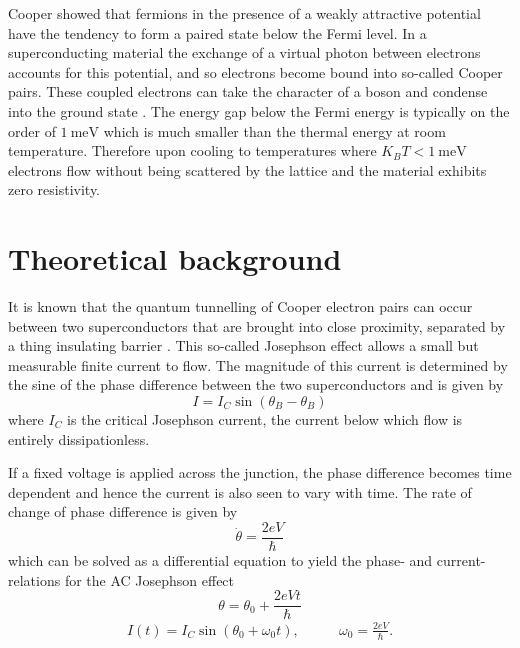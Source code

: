 \documentclass[11pt]{article}
\begin{document}
Cooper \cite{cooper-pairs} showed that fermions in the presence of a weakly attractive potential have the tendency to form a paired state below the Fermi level. In a superconducting material the exchange of a virtual photon between electrons accounts for this potential, and so electrons become bound into so-called Cooper pairs. These coupled electrons can take the character of a boson and condense into the ground state \cite{hyperphysics}. The energy gap below the Fermi energy is typically on the order of $\SI{1}{\milli\electronvolt}$ which is much smaller than the thermal energy at room temperature. Therefore upon cooling to temperatures where $K_B T < \SI{1}{\milli\electronvolt}$ electrons flow without being scattered by the lattice and the material exhibits zero resistivity.

\section{Theoretical background}
It is known that the quantum tunnelling of Cooper electron pairs can occur between two superconductors that are brought into close proximity, separated by a thing insulating barrier \cite{josephson}. This so-called Josephson effect allows a small but measurable finite current to flow. The magnitude of this current is determined by the sine of the phase difference between the two superconductors and is given by
\begin{equation}
	\label{DCjosephson}
	I=I_C \sin(\theta_B - \theta_B)
\end{equation}
where $I_C$ is the critical Josephson current, the current below which flow is entirely dissipationless.

If a fixed voltage is applied across the junction, the phase difference becomes time dependent and hence the current is also seen to vary with time. The rate of change of phase difference is given by
\begin{equation}
	\label{ACjosephson}
	\dot{\theta} = \frac{2eV}{\hbar}
\end{equation}
which can be solved as a differential equation to yield the phase- and current-relations for the AC Josephson effect
\begin{equation}
	\label{ACjosephsonPhase}
	\theta = \theta_0 + \frac{2eVt}{\hbar}
\end{equation}
\begin{equation}
	\label{ACjosephsonCurrent}
	\begin{split}
		I(t) = I_C \sin(\theta_0 + \omega_0 t),
	\end{split}
	\quad\quad
	\begin{split}
		\omega_0 = \frac{2eV}{\hbar}.
	\end{split}
\end{equation}
\end{document}
